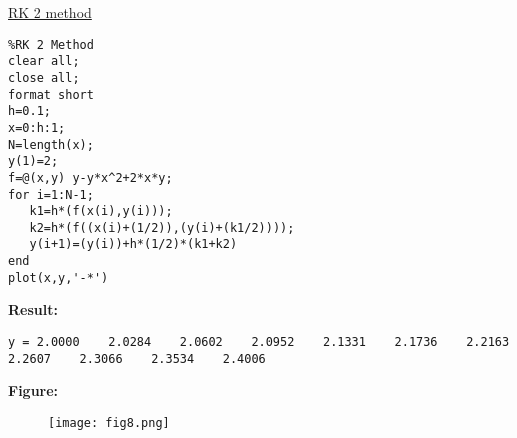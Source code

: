 \documentclass{article}
\begin{document}
\begin{enumerate}
\underline{RK 2 method}
\begin{lstlisting}
%RK 2 Method
clear all;
close all;
format short 
h=0.1;
x=0:h:1;
N=length(x);
y(1)=2;
f=@(x,y) y-y*x^2+2*x*y;
for i=1:N-1;
   k1=h*(f(x(i),y(i)));
   k2=h*(f((x(i)+(1/2)),(y(i)+(k1/2))));
   y(i+1)=(y(i))+h*(1/2)*(k1+k2) 
end
plot(x,y,'-*')
\end{lstlisting}
\textbf{Result:}
\begin{lstlisting}
y = 2.0000    2.0284    2.0602    2.0952    2.1331    2.1736    2.2163    2.2607    2.3066    2.3534    2.4006
\end{lstlisting}
\textbf{Figure:}
\begin{figure}[H]                                 
	  \centering                          
	  \texttt{[image: fig8.png]}
\caption{}
\label{fig:1.8}                        
  \end{figure}


    \end{enumerate}
\end{document}
